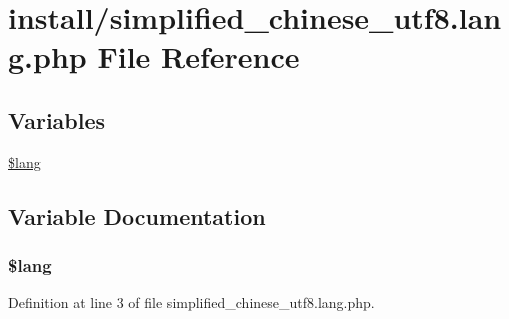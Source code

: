 \hypertarget{install_2simplified__chinese__utf8_8lang_8php}{\section{install/simplified\+\_\+chinese\+\_\+utf8.lang.\+php File Reference}
\label{install_2simplified__chinese__utf8_8lang_8php}
}
\subsection*{Variables}
\begin{DoxyCompactItemize}
\item 
\hyperlink{install_2simplified__chinese__utf8_8lang_8php_a7714b111b644017933931ec69a154102}{\$lang}
\end{DoxyCompactItemize}


\subsection{Variable Documentation}
\hypertarget{install_2simplified__chinese__utf8_8lang_8php_a7714b111b644017933931ec69a154102}{
\subsubsection[{\$lang}]{\setlength{\rightskip}{0pt plus 5cm}\$lang}}\label{install_2simplified__chinese__utf8_8lang_8php_a7714b111b644017933931ec69a154102}


Definition at line 3 of file simplified\+\_\+chinese\+\_\+utf8.\+lang.\+php.

